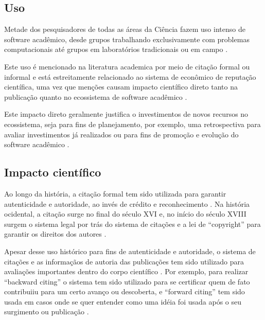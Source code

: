 \subsection{Uso}


Metade dos pesquisadores de todas as áreas da Ciência fazem uso intenso de
software acadêmico, desde grupos trabalhando exclusivamente com problemas
computacionais até grupos em laboratórios tradicionais ou em campo
\cite{wilson2014best}.

Este uso é mencionado na literatura academica por meio de citação formal ou informal
\cite{smith2016software} e está estreitamente relacionado ao sistema de
econômico de reputação científica, uma vez que
menções causam
impacto científico direto tanto na publicação quanto no ecossistema de software
acadêmico \cite{katz2014transitive}.

Este impacto direto geralmente justifica o investimentos de novos recursos no
ecossistema, seja para fins de planejamento, por exemplo, uma retrospectiva para avaliar
investimentos já realizados ou para fins de promoção e evolução do software acadêmico
\cite{howison2015understanding}.

\subsection{Impacto científico}

Ao longo da história, a citação formal tem sido utilizada para garantir
autenticidade e autoridade, ao invés de crédito e reconhecimento
\cite{katz2014transitive}.
Na história ocidental, a citação surge no final do século XVI e, no início do
século XVIII surgem o sistema legal por trás do sistema de citações e a lei de
``copyright'' para garantir os direitos dos autores \cite{katz2014transitive}.

Apesar desse uso histórico para fins de autenticidade e autoridade, o sistema de
citações e as informaçãos de autoria das publicações tem sido
utilizado para avaliações importantes dentro do corpo científico
\cite{katz2014transitive}.
Por exemplo, para realizar ``backward citing'' o sistema tem sido utilizado para se certificar quem de
fato contribuiiu para um certo avanço ou descoberta, e ``forward citing'' tem
sido usada em casos onde se quer entender como uma idéia foi usada após o seu
surgimento ou publicação \cite{katz2014transitive}.


